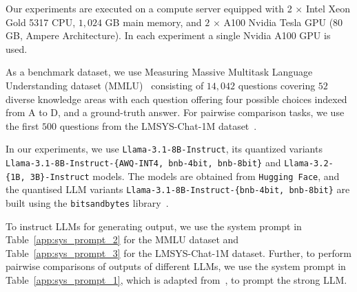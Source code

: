 \vspace{-2mm}

 Our experiments are executed on a compute server equipped with 2 $\times$ Intel Xeon Gold 5317 CPU, $1{,}024$ GB main memory, and $2$ $\times$ A100 Nvidia Tesla GPU ($80$ GB, Ampere Architecture). In each experiment a single Nvidia A100 GPU is used.


As a benchmark dataset, we use Measuring Massive Multitask Language Understanding dataset (MMLU)~\cite{hendrycks2021measuring} consisting of $14{,}042$ questions covering $52$ diverse knowledge areas with each question offering four possible choices indexed from A to D, and a ground-truth answer. For pairwise comparison tasks, we use the first $500$ questions from the LMSYS-Chat-1M dataset~\cite{zheng2024lmsys}.

 In our experiments, we 
use \texttt{Llama-3.1-8B-Instruct}, its quantized variants \texttt{Llama-3.1-8B-Instruct-\{AWQ-INT4, bnb-4bit, bnb-8bit\}} and \texttt{Llama-3.2-\{1B, 3B\}-Instruct} models. The models are obtained from \texttt{Hugging Face}, and the quantised LLM variants \texttt{Llama-3.1-8B-Instruct-\{bnb-4bit, bnb-8bit\}} are built using the \texttt{bitsandbytes} library~\cite{bitsnbytes2024bits}.

 To instruct LLMs for generating output, we use the system prompt in Table~\ref{app:sys_prompt_2} for the MMLU dataset and Table~\ref{app:sys_prompt_3} for the LMSYS-Chat-1M dataset. Further, to perform pairwise comparisons of outputs of different LLMs, we use the system prompt in Table~\ref{app:sys_prompt_1}, which is adapted from~\cite{chiang2024chatbot}, to prompt the strong LLM.

